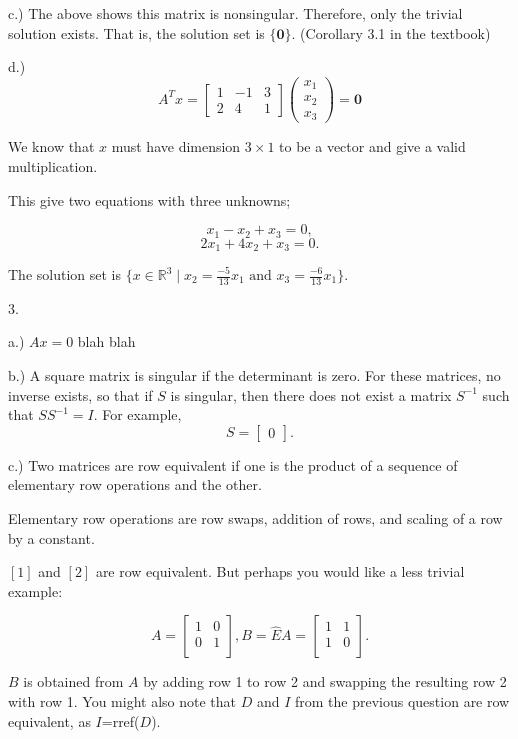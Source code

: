 \documentclass{article}
\begin{document}
c.) The above shows this matrix is nonsingular. Therefore, only the trivial solution exists. That is, the solution set is $\{\mathbf{0}\}$. (Corollary 3.1 in the textbook)


d.) $$A^Tx =\left[\begin{array}{ccc}
1 & -1 & 3\\
2 & 4 & 1
\end{array}\right] \left(\begin{array}{c}
x_1\\
x_2\\
x_3
\end{array}\right) = \mathbf{0}$$

We know that $x$ must have dimension $3\times 1$ to be a vector and give a valid multiplication. 

This give two equations with three unknowns;

$$x_1 -x_2 +x_3=0,$$
$$2x_1+4x_2+x_3=0.$$

The solution set is $\{x\in\mathbb{R}^3 \mid x_2=\frac{-5}{13}x_1 \text{ and }x_3=\frac{-6}{13}x_1\}.$

\bigskip


3. 

a.) $Ax=0$ blah blah

b.) A square matrix is singular if the determinant is zero. For these matrices, no inverse exists, so that if $S$ is singular, then there does not exist a matrix $S^{-1}$ such that $SS^{-1}=I$. For example, $$S=\left[\begin{array}{c}
0 
\end{array}\right].$$

c.) Two matrices are row equivalent if one is the product of a sequence of elementary row operations and the other. 

Elementary row operations are row swaps, addition of rows, and scaling of a row by a constant. 

$[1]$ and $[2]$ are row equivalent. But perhaps you would like a less trivial example: 


$$A=\left[\begin{array}{cc}
1 & 0\\
0 & 1\\
\end{array}\right], B=\hat{E}A=\left[\begin{array}{cc}
1 & 1\\
1 & 0\\
\end{array}\right].$$

$B$ is obtained from $A$ by adding row 1 to row 2 and swapping the resulting row 2 with row 1. You might also note that $D$ and $I$ from the previous question are row equivalent, as $I$=rref($D$). 
\end{document}
